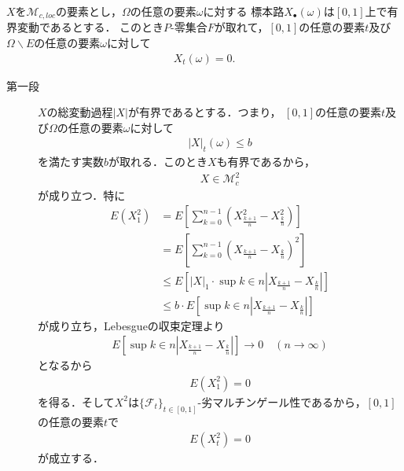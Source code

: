 	\begin{sketch}
	\end{sketch}
	
	\begin{screen}
		\begin{thm}[有界変動な局所マルチンゲールは定数]
			$X$を$\mathscr{M}_{c,loc}$の要素とし，$\Omega$の任意の要素$\omega$に対する
			標本路$X_{\bullet}(\omega)$は$[0,1]$上で有界変動であるとする．
			このとき$P$-零集合$F$が取れて，$[0,1]$の任意の要素$t$及び
			$\Omega \backslash E$の任意の要素$\omega$に対して
			\begin{align}
				X_{t}(\omega) = 0.
			\end{align}
		\end{thm}
	\end{screen}
	
	\begin{sketch}\mbox{}
		\begin{description}
			\item[第一段]
				$X$の総変動過程$|X|$が有界であるとする．つまり，
				$[0,1]$の任意の要素$t$及び$\Omega$の任意の要素$\omega$に対して
				\begin{align}
					|X|_{t}(\omega) \leq b
				\end{align}
				を満たす実数$b$が取れる．このとき$X$も有界であるから，
				\begin{align}
					X \in \mathscr{M}_{c}^{2}
				\end{align}
				が成り立つ．特に
				\begin{align}
					E\left(X_{1}^{2}\right)
					&= E\left[\sum_{k=0}^{n-1}\left(X_{\frac{k+1}{n}}^{2} - X_{\frac{k}{n}}^{2}\right)\right] \\
					&= E\left[\sum_{k=0}^{n-1}\left(X_{\frac{k+1}{n}} - X_{\frac{k}{n}}\right)^{2}\right] \\
					&\leq E\left[|X|_{1} \cdot \sup{k \in n}{\left|X_{\frac{k+1}{n}} - X_{\frac{k}{n}}\right|}\right] \\
					&\leq b \cdot E\left[\sup{k \in n}{\left|X_{\frac{k+1}{n}} - X_{\frac{k}{n}}\right|}\right]
				\end{align}
				が成り立ち，Lebesgueの収束定理より
				\begin{align}
					E\left[\sup{k \in n}{\left|X_{\frac{k+1}{n}} - X_{\frac{k}{n}}\right|}\right] \longrightarrow 0 \quad (n \longrightarrow \infty)
				\end{align}
				となるから
				\begin{align}
					E\left(X_{1}^{2}\right) = 0
				\end{align}
				を得る．そして$X^{2}$は$\{\mathscr{F}_{t}\}_{t \in [0,1]}$-劣マルチンゲール性であるから，$[0,1]$の任意の要素$t$で
				\begin{align}
					E\left(X_{t}^{2}\right) = 0
				\end{align}
				が成立する．
				

\end{description}
\end{sketch}
